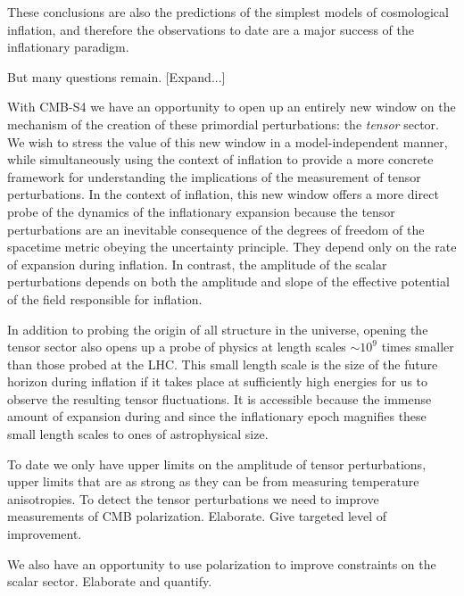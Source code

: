 These conclusions are also the predictions of the simplest models of cosmological inflation, and therefore the observations to date are a major success of the inflationary paradigm. 


But many questions remain. [Expand...]

With CMB-S4 we have an opportunity to open up an entirely new window on the mechanism of the creation of these primordial perturbations: the {\em tensor} sector. We wish to stress the value of this new window in a model-independent manner, while simultaneously using the context of 
inflation to provide a more concrete framework for understanding the implications of the measurement of tensor perturbations. In the context of inflation, this new window offers a more direct probe of the dynamics of the inflationary expansion because the tensor perturbations are an inevitable consequence of the degrees of freedom of the spacetime metric obeying the uncertainty principle. They depend only on the rate of expansion during inflation. In contrast, the amplitude of the scalar perturbations depends on both the amplitude and slope of the effective potential of the field responsible for inflation. 

In addition to probing the origin of all structure in the universe, opening the tensor sector also opens up a probe of physics at length scales $\sim 10^9$ times smaller than those probed at the LHC. This small length scale is the size of the future horizon during inflation if it takes place at sufficiently high energies for us to observe the resulting tensor fluctuations. It is accessible because the immense amount of expansion during and since the inflationary epoch magnifies
these small length scales to ones of astrophysical size. 

To date we only have upper limits on the amplitude of tensor perturbations, upper limits that are as strong as they can be from measuring temperature anisotropies. To detect the tensor perturbations we need to improve measurements of CMB polarization. Elaborate. Give targeted
level of improvement. 

We also have an opportunity to use polarization to improve constraints on the scalar sector. Elaborate and quantify.


